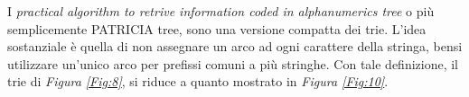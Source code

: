 \documentclass{subfiles}
\begin{document}
I \emph{practical algorithm to retrive information coded in alphanumerics tree} o più semplicemente PATRICIA tree, sono una versione compatta dei trie.
L'idea sostanziale è quella di non assegnare un arco ad ogni carattere della stringa, bensi utilizzare un'unico arco per prefissi comuni a più stringhe.
Con tale definizione, il trie di \emph{Figura \ref{Fig:8}}, si riduce a quanto mostrato in \emph{Figura \ref{Fig:10}}.

\end{document}
